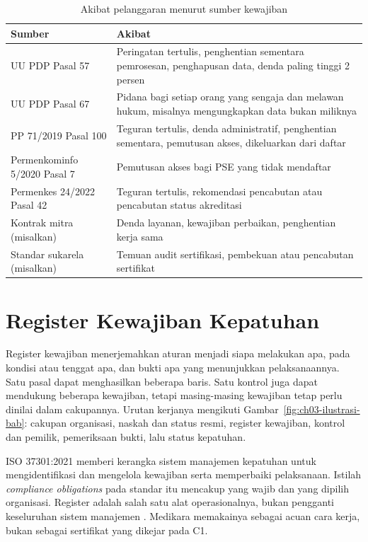 \begin{table}[!htb]
  \centering\small
  \caption{Akibat pelanggaran menurut sumber kewajiban}\label{tab:ch03-akibat}
  \begin{tabularx}{\textwidth}{|>{\raggedright\arraybackslash}p{}|>{\raggedright\arraybackslash}X|}
    \hline
    \textbf{Sumber} & \textbf{Akibat} \\ \hline
    UU PDP Pasal 57 & Peringatan tertulis, penghentian sementara pemrosesan, penghapusan data, denda paling
    tinggi 2 persen \\ \hline
    UU PDP Pasal 67 & Pidana bagi setiap orang yang sengaja dan melawan hukum, misalnya mengungkapkan data
    bukan miliknya \\ \hline
    PP 71/2019 Pasal 100 & Teguran tertulis, denda administratif, penghentian sementara, pemutusan akses,
    dikeluarkan dari daftar \\ \hline
    Permenkominfo 5/2020 Pasal 7 & Pemutusan akses bagi PSE yang tidak mendaftar \\ \hline
    Permenkes 24/2022 Pasal 42 & Teguran tertulis, rekomendasi pencabutan atau pencabutan status akreditasi \\
    \hline
    Kontrak mitra (misalkan) & Denda layanan, kewajiban perbaikan, penghentian kerja sama \\ \hline
    Standar sukarela (misalkan) & Temuan audit sertifikasi, pembekuan atau pencabutan sertifikat \\ \hline
  \end{tabularx}
\end{table}

\section{Register Kewajiban Kepatuhan}

Register kewajiban menerjemahkan aturan menjadi siapa melakukan apa, pada kondisi atau tenggat apa, dan bukti
apa yang menunjukkan pelaksanaannya. Satu pasal dapat menghasilkan beberapa baris. Satu kontrol juga dapat
mendukung beberapa kewajiban, tetapi masing-masing kewajiban tetap perlu dinilai dalam cakupannya. Urutan kerjanya
mengikuti Gambar~\ref{fig:ch03-ilustrasi-bab}: cakupan organisasi, naskah dan status resmi, register kewajiban,
kontrol dan pemilik, pemeriksaan bukti, lalu status kepatuhan.

ISO 37301:2021 memberi kerangka sistem manajemen kepatuhan untuk mengidentifikasi dan mengelola kewajiban serta
memperbaiki pelaksanaan. Istilah \textit{compliance obligations} pada standar itu mencakup yang wajib dan yang
dipilih organisasi. Register adalah salah satu alat operasionalnya, bukan pengganti keseluruhan sistem manajemen
\cite{c03-iso37301}. Medikara memakainya sebagai acuan cara kerja, bukan sebagai sertifikat yang dikejar pada C1.

